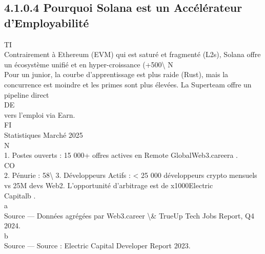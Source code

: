 \subsection{4.1.0.4 Pourquoi Solana est un Accélérateur d’Employabilité}
\vspace{0.5em}
\vspace{0.5em}
\vspace{0.5em}
\vspace{0.5em}
TI\\
Contrairement à Ethereum (EVM) qui est saturé et fragmenté (L2s), Solana offre un écosystème unifié et en hyper-croissance (+500\textbackslash{}%
\vspace{0.5em}
\vspace{0.5em}
\vspace{0.5em}
\vspace{0.5em}
N\\
Pour un junior, la courbe d’apprentissage est plus raide (Rust), mais la concurrence est moindre et les primes sont plus élevées. La Superteam offre un pipeline direct\\
\vspace{0.5em}
\vspace{0.5em}
\vspace{0.5em}
\vspace{0.5em}
DE\\
vers l’emploi via Earn.\\
\vspace{0.5em}
\vspace{0.5em}
\vspace{0.5em}
\vspace{0.5em}
FI\\
Statistiques Marché 2025\\
\vspace{0.5em}
\vspace{0.5em}
\vspace{0.5em}
\vspace{0.5em}
N\\
1. Postes ouverts : 15 000+ offres actives en Remote GlobalWeb3.careera .\\
CO\\
2. Pénurie : 58\textbackslash{}%
\vspace{0.5em}
3. Développeurs Actifs : \textless{} 25 000 développeurs crypto mensuels vs 25M devs Web2. L'opportunité d'arbitrage est de x1000Electric\\
Capitalb .\\
a\\
Source --- Données agrégées par Web3.career \textbackslash{}& TrueUp Tech Jobs Report, Q4 2024.\\
b\\
Source --- Source : Electric Capital Developer Report 2023.\\
\vspace{0.5em}
\vspace{0.5em}
\vspace{0.5em}
\vspace{0.5em}
